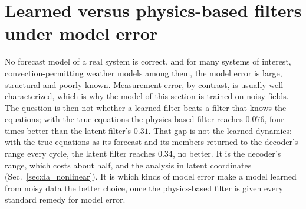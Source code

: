 \section{Learned versus physics-based filters under model error}
\label{sec:da_model_error}

No forecast model of a real system is correct, and for many systems of
interest, convection-permitting weather models among them, the model
error is large, structural and poorly known. Measurement error, by
contrast, is usually well characterized, which is why the model of this
section is trained on noisy fields. The question is then not whether a
learned filter beats a filter that knows the equations; with the true
equations the physics-based filter reaches $0.076$, four times better than
the latent filter's $0.31$. That gap is not the learned
dynamics: with the true equations as its forecast and its members
returned to the decoder's range every cycle, the latent filter reaches
$0.34$, no better. It is the decoder's range, which costs about half, and
the analysis in latent coordinates (Sec.~\ref{sec:da_nonlinear}). It is which kinds of model error make a model learned from noisy data the
better choice, once the physics-based filter is given every standard
remedy for model error.

